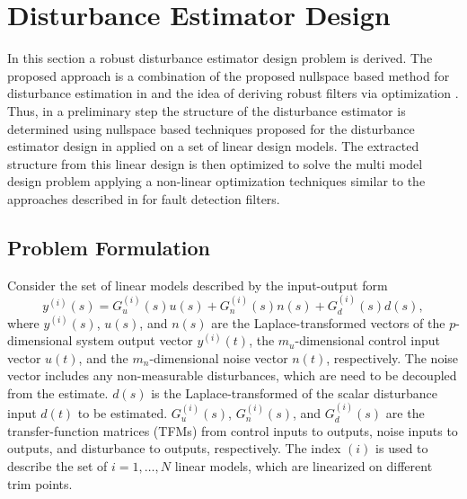 \documentclass[graybox]{svmult}
\begin{document}
\section{Disturbance Estimator Design}\label{sec:th}\vspace{-1mm}
In this section a robust disturbance estimator design problem is derived. The proposed approach is a combination of the proposed nullspace based method for disturbance estimation in \cite{Ossmann18ccta} and the idea of deriving robust filters via optimization \cite{Varga_11, OssVar_13_eucass}.
Thus, in a preliminary step the structure of the disturbance estimator is determined using nullspace based techniques proposed for the disturbance estimator design in \cite{Ossmann18ccta} applied on a set of linear design models. The extracted  structure from this linear design is then optimized to solve the multi model design problem applying a non-linear optimization techniques similar to the approaches described in \cite{Varga_11, OssVar_13_eucass} for fault detection filters.\vspace{-1mm}

\subsection{Problem Formulation}\vspace{-1mm}
Consider the set of linear models described by the input-output form
\begin{equation}\label{eq:sys}
	y^{(i)}(s) = G_u^{(i)}(s) u(s) + G_{n}^{(i)}(s) n(s)  + G_d^{(i)}(s) d(s),
\end{equation}
where $y^{(i)}(s)$, $u(s)$, and $n(s)$  are the Laplace-transformed
vectors of the $p$-dimensional system output vector $y^{(i)}(t)$, the $m_u$-dimensional control input vector $u(t)$, and the $m_{n}$-dimensional noise vector $n(t)$, respectively. The noise vector includes any non-measurable disturbances, which are need to be decoupled from the estimate. $d(s)$ is the Laplace-transformed of the scalar  disturbance input $d(t)$ to be estimated.
$G_u^{(i)}(s)$, $G_{n}^{(i)}(s)$, and $G_d^{(i)}(s)$ are the transfer-function matrices (TFMs) from control inputs to  outputs, noise inputs to outputs, and disturbance  to outputs, respectively.  The index ${(i)}$ is used to describe the set of $i=1,\dots, N$ linear models, which are linearized on different trim points.
\end{document}
